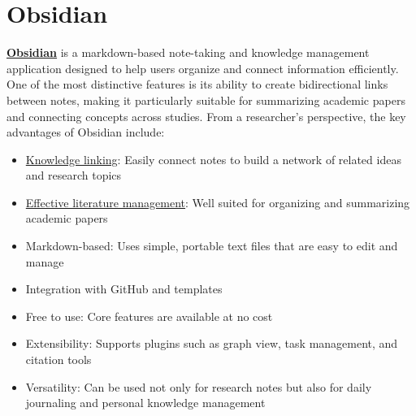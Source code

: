 \documentclass[11pt]{article}
\begin{document}
\section{Obsidian}

\href{https://obsidian.md/}{\textbf{Obsidian}} is a markdown-based note-taking and knowledge management application designed 
to help users organize and connect information efficiently. 
One of the most distinctive features is its ability to create bidirectional links 
between notes, making it particularly suitable for summarizing academic papers and connecting concepts across studies.
From a researcher’s perspective, the key advantages of Obsidian include:
\begin{itemize}
\item \uline{Knowledge linking}: Easily connect notes to build a network of related ideas and research topics
\item \uline{Effective literature management}: Well suited for organizing and summarizing academic papers
\item Markdown-based: Uses simple, portable text files that are easy to edit and manage
\item Integration with GitHub and templates
\item Free to use: Core features are available at no cost
\item Extensibility: Supports plugins such as graph view, task management, and citation tools
\item Versatility: Can be used not only for research notes but also for daily journaling and personal knowledge management
\end{itemize}
\end{document}
